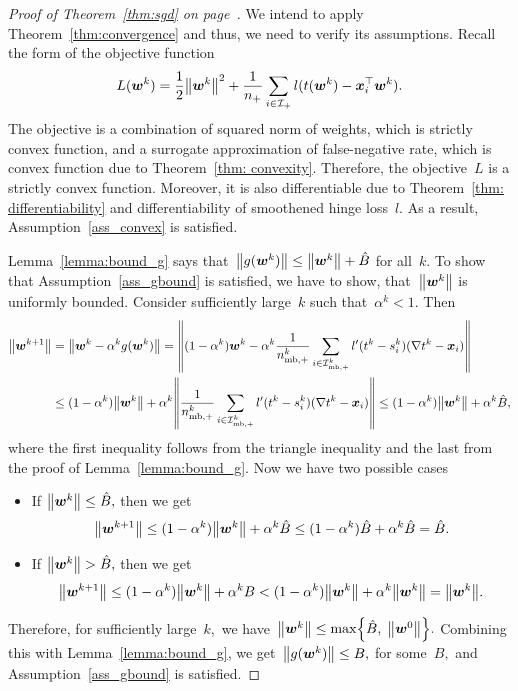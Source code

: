 \sgd*

\pagebreak

\begin{proof}[Proof of Theorem~\ref{thm:sgd} on page~\pageref{thm:sgd}]
  We intend to apply Theorem~\ref{thm:convergence} and thus, we need to verify its assumptions. Recall the form of the objective function
  \begin{equation*}
    L(\bm{w}^k)
      = \frac{1}{2} \norm{\bm{w}^k}^2 + \frac{1}{\npos} \sum_{i \in \Ipos} l(t(\bm{w}^k) - \bm{x}_i^{\top} \bm{w}^k).
  \end{equation*}
  The objective is a combination of squared norm of weights, which is strictly convex function, and a surrogate approximation of false-negative rate, which is convex function due to Theorem~\ref{thm: convexity}. Therefore, the objective~$L$ is a strictly convex function. Moreover, it is also differentiable due to Theorem~\ref{thm: differentiability} and differentiability of smoothened hinge loss~$l$. As a result, Assumption~\ref{ass_convex} is satisfied.

  Lemma~\ref{lemma:bound_g} says that~$\norm{g(\bm{w}^k)} \leq \norm{\bm{w}^k} + \hat{B}$ for all~$k.$ To show that Assumption~\ref{ass_gbound} is satisfied, we have to show, that~$\norm{\bm{w}^k}$ is uniformly bounded. Consider sufficiently large~$k$ such that~$\alpha^k < 1.$ Then
  \begin{align*}
    \norm{\bm{w}^{k+1}}
      & = \norm{\bm{w}^{k} - \alpha^k g(\bm{w}^{k})}
        = \norm{(1 - \alpha^k)\bm{w}^{k} - \alpha^k \frac{1}{\nmbpos^k} \sum_{i \in \Imbpos^k} l'(t^k - s_i^k)(\nabla t^k - \bm{x}_i)} \\
      & \leq (1 - \alpha^k) \norm{\bm{w}^{k}} + \alpha^k \norm{\frac{1}{\nmbpos^k} \sum_{i \in \Imbpos^k} l'(t^k - s_i^k)(\nabla t^k - \bm{x}_i)}
      \leq (1 - \alpha^k) \norm{\bm{w}^{k}} + \alpha^k \hat{B},
  \end{align*}
  where the first inequality follows from the triangle inequality and the last from the proof of Lemma~\ref{lemma:bound_g}. Now we have two possible cases
  \begin{itemize}
    \item If $\norm{\bm{w}^k} \leq \hat{B},$ then we get
    \begin{equation*}
      \norm{\bm{w}^{k+1}}
        \leq (1 - \alpha^k) \norm{\bm{w}^{k}} + \alpha^k \hat{B}
        \leq (1 - \alpha^k) \hat{B} + \alpha^k \hat{B}
        = \hat{B}.
    \end{equation*}
    \item If $\norm{\bm{w}^k} > \hat{B},$ then we get
    \begin{equation*}
      \norm{\bm{w}^{k+1}}
        \leq (1 - \alpha^k) \norm{\bm{w}^{k}} + \alpha^k B
        < (1 - \alpha^k) \norm{\bm{w}^{k}} + \alpha^k \norm{\bm{w}^{k}}
        = \norm{\bm{w}^{k}}.
    \end{equation*}
  \end{itemize}
  Therefore, for sufficiently large~$k,$ we have~$\norm{\bm{w}^{k}} \leq \max \Brac[c]{\hat{B}, \; \norm{\bm{w}^0}}.$ Combining this with Lemma~\ref{lemma:bound_g}, we get~$\norm{g(\bm{w}^k)} \leq B,$ for some~$B,$ and Assumption~\ref{ass_gbound} is satisfied.


\end{proof}
